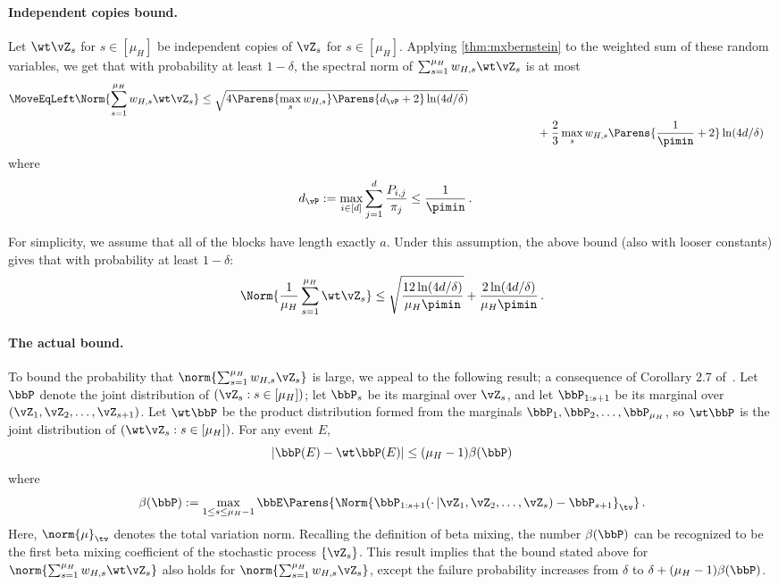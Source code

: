 \paragraph{Independent copies bound.}
Let $\wt\vZ_s$ for $s \in [\mu_H]$ be independent copies of
$\vZ_s$ for $s \in [\mu_H]$.
Applying \cref{thm:mxbernstein} to the weighted sum of these random variables, we  get that 
with probability at least $1-\delta$, the spectral norm of
$\sum_{s=1}^{\mu_H} w_{H,s} \wt\vZ_s$ is at most
\begin{align*}
\MoveEqLeft  \Norm{\sum_{s=1}^{\mu_H} w_{H,s} \wt\vZ_s}
  \leq
  \sqrt{
    4\Parens{ \max_s w_{H,s} } \Parens{
      d_{\vP}
      + 2
    }
    \ln(4d/\delta)
  }
  \\
& \qquad\qquad\qquad  +
  \frac23 \max_s w_{H,s}
  \Parens{
    \frac1{\pimin} + 2
  }
  \ln(4d/\delta)
\end{align*}
where
\begin{align*}
  d_{\vP}
  & := \max_{i \in [d]} \sum_{j=1}^d \frac{P_{i,j}}{\pi_j}
  \leq
  \frac{1}{\pimin}
  \,.
\end{align*}

For simplicity, we assume that all of the blocks have length exactly $a$.
Under this assumption, 
the above bound (also with looser constants) gives that
with probability at least $1-\delta$:
\begin{equation}
\label{eq:indbound}
  \Norm{\frac1{\mu_H} \sum_{s=1}^{\mu_H} \wt\vZ_s}
  \leq
  \sqrt{
    \frac{12\ln(4d/\delta)}{\mu_H\pimin}
  }
  +
  \frac{2\ln(4d/\delta)}{\mu_H\pimin}
  \,.
\end{equation}

\paragraph{The actual bound.}
To bound the probability that $\norm{\sum_{s=1}^{\mu_H} w_{H,s}
\vZ_s}$ is large, we appeal to the following result; a consequence of
Corollary 2.7 of~\citet{Yu94}.
Let $\bbP$ denote the joint distribution of $(\vZ_s : s \in [\mu_H])$;
let $\bbP_s$ be its marginal over $\vZ_s$, and let $\bbP_{1:s+1}$ be
its marginal over $(\vZ_1,\vZ_2,\dotsc,\vZ_{s+1})$.
Let $\wt\bbP$ be the product distribution formed from the marginals
$\bbP_1,\bbP_2,\dotsc,\bbP_{\mu_H}$, so $\wt\bbP$ is the joint
distribution of $(\wt\vZ_s : s \in [\mu_H])$.
For any event $E$,
\[
  |\bbP(E) - \wt\bbP(E)| \leq (\mu_H-1) \beta(\bbP)
\]
where
\[
  \beta(\bbP)
  := \max_{1 \leq s \leq \mu_H-1}
  \bbE\Parens{
    \Norm{
      \bbP_{1:s+1}(\cdot\,|\vZ_1,\vZ_2,\dotsc,\vZ_s) - \bbP_{s+1}
    }_{\tv}
  }
  \,.
\]
Here, $\norm{\mu}_{\tv}$ denotes the total variation norm.
Recalling the definition of beta mixing,
the number $\beta(\bbP)$ can be recognized to be the first beta mixing coefficient of the stochastic process $\{\vZ_s\}$.
This result implies that the bound stated above for
$\norm{\sum_{s=1}^{\mu_H} w_{H,s} \wt\vZ_s}$ also holds for
$\norm{\sum_{s=1}^{\mu_H} w_{H,s} \vZ_s}$, except the failure
probability increases from $\delta$ to $\delta +
(\mu_H-1)\beta(\bbP)$.

